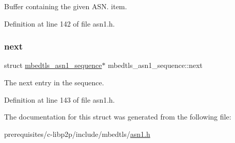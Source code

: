 Buffer containing the given A\+S\+N. item. 

Definition at line 142 of file asn1.\+h.

\mbox{\label{structmbedtls__asn1__sequence_ac81969ddae2ace4340503530588d83e1}} 
\subsubsection{\texorpdfstring{next}{next}}
{\footnotesize\ttfamily struct \mbox{\hyperlink{structmbedtls__asn1__sequence}{mbedtls\+\_\+asn1\+\_\+sequence}}$\ast$ mbedtls\+\_\+asn1\+\_\+sequence\+::next}

The next entry in the sequence. 

Definition at line 143 of file asn1.\+h.



The documentation for this struct was generated from the following file\+:\begin{DoxyCompactItemize}
\item 
prerequisites/c-\/libp2p/include/mbedtls/\mbox{\hyperlink{asn1_8h}{asn1.\+h}}\end{DoxyCompactItemize}
